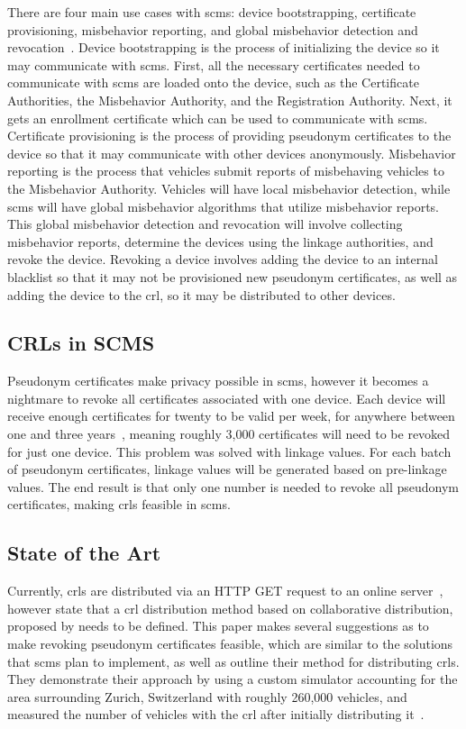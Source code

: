 \documentclass {article}
\begin{document}
There are four main use cases with \gls{scms}: device bootstrapping, certificate provisioning, misbehavior reporting, and global misbehavior detection and revocation~\autocite{brecht_security_2018}. Device bootstrapping is the process of initializing the device so it may communicate with \gls{scms}. First, all the necessary certificates needed to communicate with \gls{scms} are loaded onto the device, such as the Certificate Authorities, the Misbehavior Authority, and the Registration Authority. Next, it gets an enrollment certificate which can be used to communicate with \gls{scms}. Certificate provisioning is the process of providing pseudonym certificates to the device so that it may communicate with other devices anonymously. Misbehavior reporting is the process that vehicles submit reports of misbehaving vehicles to the Misbehavior Authority. Vehicles will have local misbehavior detection, while \gls{scms} will have global misbehavior algorithms that utilize misbehavior reports. This global misbehavior detection and revocation will involve collecting misbehavior reports, determine the devices using the linkage authorities, and revoke the device. Revoking a device involves adding the device to an internal blacklist so that it may not be provisioned new pseudonym certificates, as well as adding the device to the \gls{crl}, so it may be distributed to other devices.

\subsection{CRLs in SCMS}
Pseudonym certificates make privacy possible in \gls{scms}, however it becomes a nightmare to revoke all certificates associated with one device. Each device will receive enough certificates for twenty to be valid per week, for anywhere between one and three years~\autocite{brecht_security_2018}, meaning roughly 3,000 certificates will need to be revoked for just one device. This problem was solved with linkage values. For each batch of pseudonym certificates, linkage values will be generated based on pre-linkage values. The end result is that only one number is needed to revoke all pseudonym certificates, making \gls{crl}s feasible in \gls{scms}.

\subsection{State of the Art}
Currently, \gls{crl}s are distributed via an HTTP GET request to an online server~\autocite{brecht_scms_nodate}, however \autocite{brecht_security_2018} state that a \gls{crl} distribution method based on collaborative distribution, proposed by \autocite{haas_efficient_2011} needs to be defined. This paper makes several suggestions as to make revoking pseudonym certificates feasible, which are similar to the solutions that \gls{scms} plan to implement, as well as outline their method for distributing \gls{crl}s. They demonstrate their approach by using a custom simulator accounting for the area surrounding Zurich, Switzerland with roughly 260,000 vehicles, and measured the number of vehicles with the \gls{crl} after initially distributing it~\autocite{haas_efficient_2011}.
\end{document}
